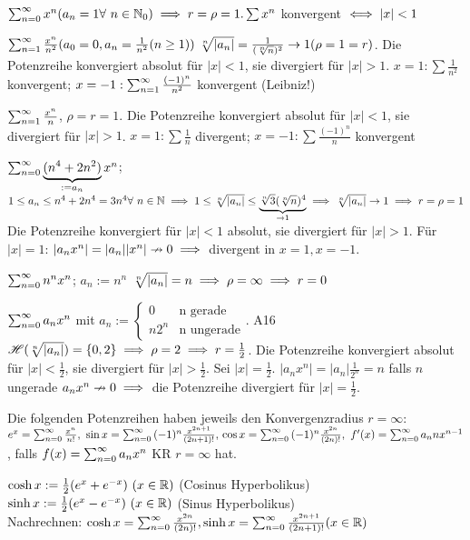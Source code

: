 \documentclass[a4paper,oneside,DIV15,BCOR12mm]{scrbook}
\begin{document}
\begin{beispiele}
\item $\reihenull{x^n} (a_n=1\forall\ n\in\MdN_0)\folgt r=\rho=1. \sum{x^n}$ konvergent $\iff |x|<1$
\item $\sum_{n=1}^{\infty}{\frac{x^n}{n^2}} (a_0=0, a_n=\frac{1}{n^2} (n\ge1))\ \sqrt[n]{|a_n|}=\frac{1}{(\sqrt[n]{n})^2} \to 1 (\rho=1=r)$. Die Potenzreihe konvergiert absolut für $|x|<1$, sie divergiert für $|x|>1$. $x=1: \sum\frac{1}{n^2}$ konvergent; $x=-1: \sum_{n=1}^{\infty}{\frac{(-1)^n}{n^2}}$ konvergent (Leibniz!)
\item $\sum_{n=1}^{\infty}{\frac{x^n}{n}}$, $\rho=r=1$. Die Potenzreihe konvergiert absolut für $|x|<1$, sie divergiert für $|x|>1$. $x=1: \sum{\frac{1}{n}}$ divergent; $x=-1: \sum{\frac{(-1)^n}{n}}$ konvergent
\item $\sum_{n=0}^{\infty}{\underbrace{(n^4+2n^2)}_{:=a_n}x^n}$; $1\le a_n \le n^4+2n^4=3n^4 \forall\ n\in\mathbb{N} \implies 1\le \sqrt[n]{|a_n|} \le \underbrace{\sqrt[n]{3}(\sqrt[n]{n})^4}_{\to 1}
\implies \sqrt[n]{|a_n|} \to 1 \implies r=\rho=1$ Die Potenzreihe konvergiert für $|x|<1$ absolut, sie divergiert für $|x|>1$. Für $|x|=1$: $|a_nx^n|=|a_n||x^n| \nrightarrow 0 \implies $ divergent in $x=1, x=-1$.
\item $\sum_{n=0}^{\infty}{n^nx^n}$; $a_n:=n^n$ $\sqrt[n]{|a_n|}=n \implies \rho=\infty \implies r=0$
\item $\sum_{n=0}^{\infty}{a_nx^n}$ mit $a_n:=\begin{cases}
0&\text{n gerade}\\
n2^n&\text{n ungerade}\end{cases}$. A16 \folgt $\mathscr{H}(\sqrt[n]{|a_n|})=\{0, 2\}
\implies \rho=2 \implies r=\frac{1}{2}$. Die Potenzreihe konvergiert absolut für $|x|<\frac{1}{2}$, sie divergiert für $|x|>\frac{1}{2}$. Sei $|x|=\frac{1}{2}$. $|a_nx^n|=|a_n|\frac{1}{2^n}=n$ falls $n$ ungerade \folgt $a_nx^n \nrightarrow 0 \implies$ die Potenzreihe divergiert für $|x|=\frac{1}{2}$.
\end{beispiele}
Die folgenden Potenzreihen haben jeweils den Konvergenzradius $r=\infty:$\\ 
$e^x=\reihenull{\frac{x^n}{n!},\ \sin x=\reihenull{(-1)^n\frac{x^{2n+1}}{(2n+1)!}}},\\ \cos x = \reihenull{(-1)^n\frac{x^{2n}}{(2n)!}},\ f'(x)=\reihenull{a_nnx^{n-1}}$, falls $f(x)=\sum_{n=0}^{\infty}{a_nx^n}$ KR $r=\infty$ hat.

\begin{definition}
$\cosh x:=\frac{1}{2}(e^x+e^{-x})\ (x\in\MdR)$ (Cosinus Hyperbolikus)\\
$\sinh x:=\frac{1}{2}(e^x-e^{-x})\ (x\in\MdR)$ (Sinus Hyperbolikus)\\
Nachrechnen: $\cosh x=\sum_{n=0}^{\infty}{\frac{x^{2n}}{(2n)!}}, 
\sinh x=\sum_{n=0}^{\infty}{\frac{x^{2n+1}}{(2n+1)!}} (x\in\mathbb{R})$
\end{definition}
\end{document}
